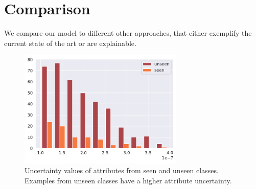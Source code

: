 \documentclass[a4paper,cleardoubleempty,BCOR1cm, 11pt]{report}
\begin{document}








\section{Comparison}\label{sec:results}
We compare our model to different other approaches, that either exemplify the current state of the art or are explainable.

\begin{figure}[t!]
	\centering
		\includegraphics[width=0.7\textwidth]{images/zero_shot_class_uncertainty_median_hist.pdf}
\caption{Uncertainty values of attributes from seen and unseen classes. Examples from unseen classes have a higher attribute uncertainty.}
\label{fig:zero_shot_uncert}
\end{figure}
\end{document}
